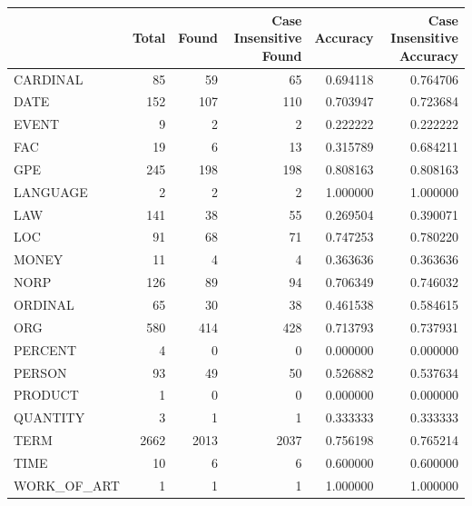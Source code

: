 \begin{tabular}{lrrrrr}
\toprule
 & Total & Found & Case Insensitive Found & Accuracy & Case Insensitive Accuracy \\
\midrule
CARDINAL & 85 & 59 & 65 & 0.694118 & 0.764706 \\
DATE & 152 & 107 & 110 & 0.703947 & 0.723684 \\
EVENT & 9 & 2 & 2 & 0.222222 & 0.222222 \\
FAC & 19 & 6 & 13 & 0.315789 & 0.684211 \\
GPE & 245 & 198 & 198 & 0.808163 & 0.808163 \\
LANGUAGE & 2 & 2 & 2 & 1.000000 & 1.000000 \\
LAW & 141 & 38 & 55 & 0.269504 & 0.390071 \\
LOC & 91 & 68 & 71 & 0.747253 & 0.780220 \\
MONEY & 11 & 4 & 4 & 0.363636 & 0.363636 \\
NORP & 126 & 89 & 94 & 0.706349 & 0.746032 \\
ORDINAL & 65 & 30 & 38 & 0.461538 & 0.584615 \\
ORG & 580 & 414 & 428 & 0.713793 & 0.737931 \\
PERCENT & 4 & 0 & 0 & 0.000000 & 0.000000 \\
PERSON & 93 & 49 & 50 & 0.526882 & 0.537634 \\
PRODUCT & 1 & 0 & 0 & 0.000000 & 0.000000 \\
QUANTITY & 3 & 1 & 1 & 0.333333 & 0.333333 \\
TERM & 2662 & 2013 & 2037 & 0.756198 & 0.765214 \\
TIME & 10 & 6 & 6 & 0.600000 & 0.600000 \\
WORK_OF_ART & 1 & 1 & 1 & 1.000000 & 1.000000 \\
\bottomrule
\end{tabular}
